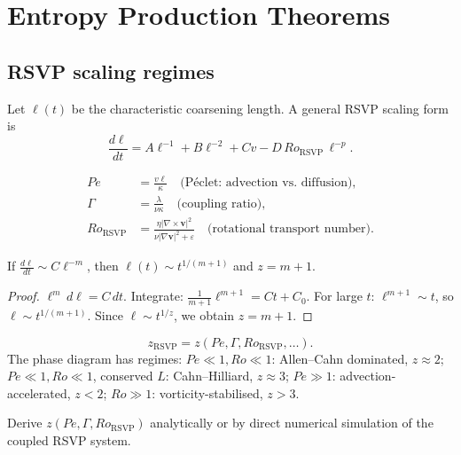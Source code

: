 
\chapter{Entropy Production Theorems}
\label{ch:entropy-production}

\section{RSVP scaling regimes}

Let $\ell(t)$ be the characteristic coarsening length.
A general RSVP scaling form is
\[
  \frac{d\ell}{dt}
  = A\ell^{-1} + B\ell^{-2} + Cv - D\,Ro_{\mathrm{RSVP}}\,\ell^{-p}.
\]

\begin{definition}
  \label{def:rsvp-params}
  \begin{align*}
    Pe &= \frac{v\ell}{\kappa}
    \quad\text{(Péclet: advection vs.\ diffusion)},\\
    \Gamma &= \frac{\lambda}{\nu\kappa}
    \quad\text{(coupling ratio)},\\
    Ro_{\mathrm{RSVP}} &= \frac{\eta|\nabla\times\mathbf{v}|^2}
      {\nu|\nabla\mathbf{v}|^2 + \varepsilon}
    \quad\text{(rotational transport number)}.
  \end{align*}
\end{definition}

\begin{proposition}
  \label{prop:dom-balance}
  \statusproven{}
  If $\frac{d\ell}{dt} \sim C\ell^{-m}$, then
  $\ell(t) \sim t^{1/(m+1)}$ and $z = m+1$.
\end{proposition}

\begin{proof}
  $\ell^m\,d\ell = C\,dt$.
  Integrate: $\frac{1}{m+1}\ell^{m+1} = Ct + C_0$.
  For large $t$: $\ell^{m+1} \sim t$, so $\ell \sim t^{1/(m+1)}$.
  Since $\ell \sim t^{1/z}$, we obtain $z = m+1$.
\end{proof}

\begin{conjecture}
  \label{conj:rsvp-phase-diagram}
  \statusconjectured{}
  \[
    z_{\mathrm{RSVP}} = z(Pe, \Gamma, Ro_{\mathrm{RSVP}}, \ldots).
  \]
  The phase diagram has regimes:
  $Pe \ll 1, Ro \ll 1$: Allen--Cahn dominated, $z \approx 2$;
  $Pe \ll 1, Ro \ll 1$, conserved $L$: Cahn--Hilliard, $z \approx 3$;
  $Pe \gg 1$: advection-accelerated, $z < 2$;
  $Ro \gg 1$: vorticity-stabilised, $z > 3$.
\end{conjecture}

\begin{OpenQuestion}
  Derive $z(Pe, \Gamma, Ro_{\mathrm{RSVP}})$ analytically or
  by direct numerical simulation of the coupled RSVP system.
\end{OpenQuestion}
